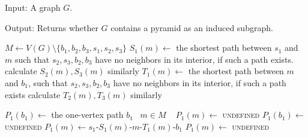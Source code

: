 \begin{alg}
	\label{alg:testPyramid}
	Input: A graph $G$.

	\noindent Output: Returns whether $G$ contains a pyramid as an induced subgraph.
\end{alg}
\begin{algorithmic}[1]
	 \label{line:pyramidTriangle}
		 \label{line:pyramidTriple}
			\label{line:a}
				\ls $M \gets V(G) \setminus \{b_1, b_2, b_3, s_1, s_2, s_3\}$
				 \label{line:pyramidSStart}
					\ls $S_1(m) \gets$ the shortest path between $s_1$ and $m$ such that
					\lsx $s_2, s_3, b_2, b_3$ have no neighbors in its interior, if such a 
					\lsx path exists.
					\ls calculate $S_2(m), S_3(m)$ similarly
					\ls $T_1(m) \gets$ the shortest path between $m$ and $b_1$, such that
					\lsx $s_2, s_3, b_2, b_3$ have no neighbors in its interior, if such a
					\lsx path exists
					\ls calculate $T_2(m), T_3(m)$ similarly
				\mEndFor \label{line:pyramidSEnd}
				 
					 
						\ls $P_1(b_1) \gets$ the one-vertex path $b_1$
						\ls \algorithmicforeach ~$m \in M$ \algorithmicdo~ $P_1(m) \gets$ \textsc{undefined}
					\mElse
						\ls $P_1(b_1) \gets $ \textsc{undefined}
								\ls $P_1(m) \gets s_1$-$S_1(m)$-$m$-$T_1(m)$-$b_1$
							\mElse
								\ls $P_1(m) \gets$ \textsc{undefined}
							\mEndIf
						\mEndFor
					\mEndIf 
				

\end{algorithmic}
